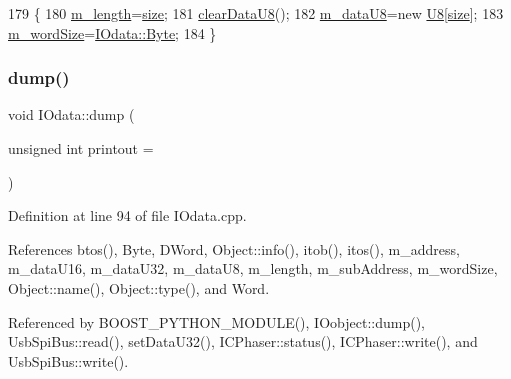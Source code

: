 \begin{DoxyCode}
179                                     \{
180     \hyperlink{classIOdata_afabe57441da019eb614d277799106aac}{m\_length}=\hyperlink{namespacecat_a3eae50bb86a614752045105e00365a46}{size};
181     \hyperlink{classIOdata_a9bc3ea0458ea6d13bd751ac4c80a4be6}{clearDataU8}();
182     \hyperlink{classIOdata_a9c4c0dc5104f7f3b170e30ab78fe61e7}{m\_dataU8}=\textcolor{keyword}{new} \hyperlink{ICECALv3_8h_a3cb25ca6f51f003950f9625ff05536fc}{U8}[\hyperlink{namespacecat_a3eae50bb86a614752045105e00365a46}{size}];
183     \hyperlink{classIOdata_a719b0ce607ada4fa91b12d6ecfa1b4c9}{m\_wordSize}=\hyperlink{classIOdata_a37c53ebf4bf8d866aac8af572962a84ca00156611f08eeb1b5d361de809dafb8e}{IOdata::Byte};
184   \}
\end{DoxyCode}
\mbox{\label{classIOdata_a208e24222bf2044a4ff8bbb1a6bdc13b}} 
\subsubsection{\texorpdfstring{dump()}{dump()}}
{\footnotesize\ttfamily void I\+Odata\+::dump (\begin{DoxyParamCaption}\item[{unsigned int}]{printout = {} }\end{DoxyParamCaption})}



Definition at line 94 of file I\+Odata.\+cpp.



References btos(), Byte, D\+Word, Object\+::info(), itob(), itos(), m\+\_\+address, m\+\_\+data\+U16, m\+\_\+data\+U32, m\+\_\+data\+U8, m\+\_\+length, m\+\_\+sub\+Address, m\+\_\+word\+Size, Object\+::name(), Object\+::type(), and Word.



Referenced by B\+O\+O\+S\+T\+\_\+\+P\+Y\+T\+H\+O\+N\+\_\+\+M\+O\+D\+U\+L\+E(), I\+Oobject\+::dump(), Usb\+Spi\+Bus\+::read(), set\+Data\+U32(), I\+C\+Phaser\+::status(), I\+C\+Phaser\+::write(), and Usb\+Spi\+Bus\+::write().


